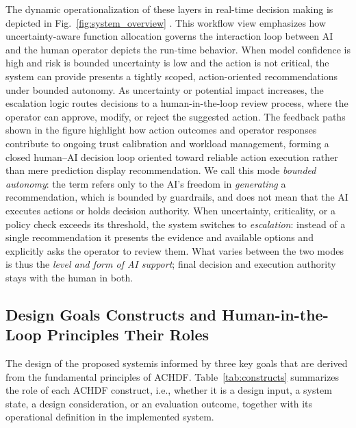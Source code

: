 \documentclass[journal]{IEEEtran}
\theoremstyle{plain}
\theoremstyle{definition}
\providecommand{\DIFaddtex}[1]{{\protect\color{blue} \sf #1}} %
\providecommand{\DIFdeltex}[1]{{\protect\color{red} \scriptsize #1}} %
\providecommand{\DIFaddbegin}{} %
\providecommand{\DIFaddend}{} %
\providecommand{\DIFdelbegin}{} %
\providecommand{\DIFdelend}{} %
\providecommand{\DIFadd}[1]{\texorpdfstring{\DIFaddtex{#1}}{#1}} %
\providecommand{\DIFdel}[1]{\texorpdfstring{\DIFdeltex{#1}}{}} %
\newcommand{\DIFscaledelfig}{0.5}
\newlength{\DIFdelgraphicswidth} %
\newlength{\DIFdelgraphicsheight} %
\newcommand{\DIFaddincludegraphics}[2][]{{\color{blue}\fbox{\DIFOincludegraphics[#1]{#2}}}} %
\newcommand{\DIFdelincludegraphics}[2][]{%
\sbox{\DIFdelgraphicsbox}{\DIFOincludegraphics[#1]{#2}}%
\settoboxwidth{\DIFdelgraphicswidth}{\DIFdelgraphicsbox} %
\settoboxtotalheight{\DIFdelgraphicsheight}{\DIFdelgraphicsbox} %
\scalebox{\DIFscaledelfig}{%
\parbox[b]{\DIFdelgraphicswidth}{\usebox{\DIFdelgraphicsbox}\\[-\baselineskip] \rule{\DIFdelgraphicswidth}{0em}}\llap{\resizebox{\DIFdelgraphicswidth}{\DIFdelgraphicsheight}{%
\setlength{\unitlength}{\DIFdelgraphicswidth}%
\begin{picture}(1,1)%
\thicklines\linethickness{2pt} %
{\color[rgb]{1,0,0}\put(0,0){\framebox(1,1){}}}%
{\color[rgb]{1,0,0}\put(0,0){\line( 1,1){1}}}%
{\color[rgb]{1,0,0}\put(0,1){\line(1,-1){1}}}%
\end{picture}%
}\hspace*{3pt}}} %
} %
\DeclareRobustCommand{\DIFaddbegin}{\DIFOaddbegin \let\includegraphics\DIFaddincludegraphics} %
\DeclareRobustCommand{\DIFaddend}{\DIFOaddend \let\includegraphics\DIFOincludegraphics} %
\DeclareRobustCommand{\DIFdelbegin}{\DIFOdelbegin \let\includegraphics\DIFdelincludegraphics} %
\DeclareRobustCommand{\DIFdelend}{\DIFOaddend \let\includegraphics\DIFOincludegraphics} %
\begin{document}
    \DIFdelbegin \DIFdel{The dynamic operationalization of these layers in real-time decision making is depicted in }\DIFdelend Fig.~\ref{fig:system_overview} \DIFdelbegin \DIFdel{. 
This workflow view emphasizes how uncertainty-aware function allocation governs the interaction loop between AI and the human operator}\DIFdelend \DIFaddbegin \DIFadd{depicts the run-time behavior}\DIFaddend . When model \DIFdelbegin \DIFdel{confidence is high and risk is bounded}\DIFdelend \DIFaddbegin \DIFadd{uncertainty is low and the action is not critical}\DIFaddend , the system \DIFdelbegin \DIFdel{can provide }\DIFdelend \DIFaddbegin \DIFadd{presents a }\DIFaddend tightly scoped, action-oriented \DIFdelbegin \DIFdel{recommendations under bounded autonomy. As uncertainty or potential impact increases, the escalation logic routes decisions to a human-in-the-loop review process, where the operator can approve, modify, or reject the suggested action. The feedback paths shown in the figure highlight how action outcomes and operator responses contribute to ongoing trust calibration and workload management, forming a closed human--AI decision loop oriented toward reliable action execution rather than mere prediction display}\DIFdelend \DIFaddbegin \DIFadd{recommendation. We call this mode \emph{bounded autonomy}: the term refers only to the AI's freedom in \emph{generating} a recommendation, which is bounded by guardrails, and does not mean that the AI executes actions or holds decision authority. When uncertainty, criticality, or a policy check exceeds its threshold, the system switches to \emph{escalation}: instead of a single recommendation it presents the evidence and available options and explicitly asks the operator to review them. What varies between the two modes is thus the \emph{level and form of AI support}; final decision and execution authority stays with the human in both}\DIFaddend .

    \subsection{\DIFdelbegin \DIFdel{Design Goals }\DIFdelend \DIFaddbegin \DIFadd{Constructs }\DIFaddend and \DIFdelbegin \DIFdel{Human-in-the-Loop Principles}\DIFdelend \DIFaddbegin \DIFadd{Their Roles}\DIFaddend }
    \DIFdelbegin \DIFdel{The design of the proposed systemis informed by three key goals that are derived from the fundamental principles of ACHDF. }\DIFdelend \DIFaddbegin \label{sec:constructs}
    \DIFadd{Table~\ref{tab:constructs} summarizes the role of each ACHDF construct, i.e., whether it is a design input, a system state, a design consideration, or an evaluation outcome, together with its operational definition in the implemented system.
}\DIFaddend 
\end{document}
